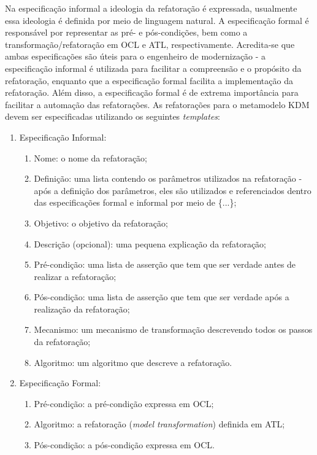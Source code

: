 Na especificação informal a ideologia da refatoração é expressada, usualmente essa ideologia é definida por meio de linguagem natural. A especificação formal é responsável por representar as pré- e pós-condições, bem como a transformação/refatoração em OCL e ATL, respectivamente. Acredita-se que ambas especificações são úteis para o engenheiro de modernização - a especificação informal é utilizada para facilitar a compreensão e o propósito da refatoração, enquanto que a especificação formal facilita a implementação da refatoração. Além disso, a especificação formal é de extrema importância para facilitar a automação das refatorações. 
%
%
%
%
As refatorações para o metamodelo KDM devem ser especificadas utilizando os seguintes \textit{templates}:

\begin{enumerate}
	\item Especificação Informal:
		\begin{enumerate}
			\item Nome: o nome da refatoração;
			\item Definição: uma lista contendo os parâmetros utilizados na refatoração - após a definição dos parâmetros, eles são utilizados e referenciados dentro das especificações formal e informal por meio de \{...\};
			\item Objetivo: o objetivo da refatoração;
			\item Descrição (opcional): uma pequena explicação da refatoração;
			\item Pré-condição: uma lista de asserção que tem que ser verdade antes de realizar a refatoração;
			\item Pós-condição: uma lista de asserção que tem que ser verdade após a realização da refatoração;
			\item Mecanismo: um mecanismo de transformação descrevendo todos os passos da refatoração;
			\item Algoritmo: um algoritmo que descreve a refatoração.
		\end{enumerate}
	\item Especificação Formal:
		\begin{enumerate}
			\item Pré-condição: a pré-condição expressa em OCL;
			\item Algoritmo: a refatoração (\textit{model transformation}) definida em ATL;
			\item Pós-condição: a pós-condição expressa em OCL.
		\end{enumerate}
\end{enumerate}


